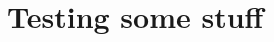 \documentclass[twoside,11pt]{article}
\newcommand{\states}{\mathcal{X}}
\newcommand{\processes}{\mathbb{P}}
\newcommand{\wprocesses}{\processes^{\mathrm{W}}}
\newcommand{\rateset}{\mathcal{Q}}
\begin{document}

\section{Testing some stuff}
\end{document}
